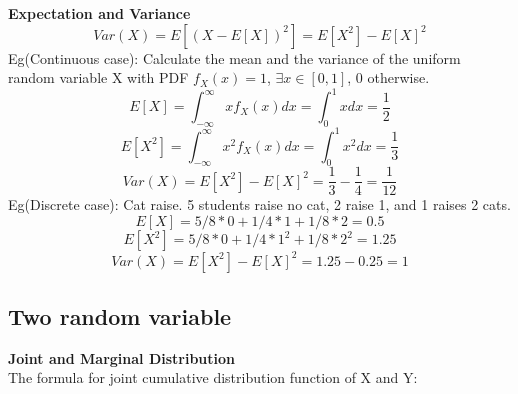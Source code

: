 \documentclass[a4paper,12pt]{article}
\begin{document}
\textbf{Expectation and Variance} \\
$$Var(X) = E[(X - E[X])^2] = E[X^2] - E[X]^2$$
Eg(Continuous case): Calculate the mean and the variance of the uniform random variable X with PDF $f_X(x) = 1$, $\exists x \in [0,1]$, 0 otherwise.
$$E[X] = \int_{-\infty}^{\infty} xf_X(x) dx = \int_{0}^{1} xdx = \frac{1}{2} $$
$$E[X^2] = \int_{-\infty}^{\infty} x^2f_X(x) dx = \int_{0}^{1} x^2dx = \frac{1}{3}$$
$$Var(X) = E[X^2] - E[X]^2 = \frac{1}{3} - \frac{1}{4} = \frac{1}{12}$$
Eg(Discrete case): Cat raise. 5 students raise no cat, 2 raise 1, and 1 raises 2 cats.
$$E[X] = 5/8 * 0 + 1/4 * 1 + 1/8 *2 = 0.5$$
$$E[X^2] = 5/8 * 0 + 1/4 * 1^2 + 1/8 *2^2 = 1.25$$
$$Var(X) = E[X^2] - E[X]^2 = 1.25 - 0.25 = 1$$
\subsection{Two random variable}
\textbf{Joint and Marginal Distribution} \\
The formula for joint cumulative distribution function of X and Y:
\end{document}
